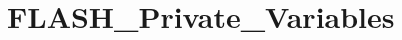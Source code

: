 \hypertarget{group___f_l_a_s_h___private___variables}{\section{F\-L\-A\-S\-H\-\_\-\-Private\-\_\-\-Variables}
\label{group___f_l_a_s_h___private___variables}
}
